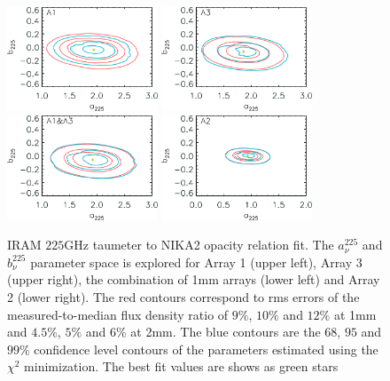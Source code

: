 \begin{figure}[ht!]
  \begin{center}
    \includegraphics[clip=true, trim={0, -0.3cm, -0.3cm, 0}, width=0.4\textwidth]{Figures/Opacity/fit_nika2_tau_from_taumeter_mwc349_a1.pdf}
    \includegraphics[clip=true, trim={0, -0.3cm, -0.3cm, 0}, width=0.4\textwidth]{Figures/Opacity/fit_nika2_tau_from_taumeter_mwc349_a3.pdf}
    \includegraphics[clip=true, trim={0, -0.3cm, -0.3cm, 0}, width=0.4\textwidth]{Figures/Opacity/fit_nika2_tau_from_taumeter_mwc349_1mm.pdf}
    \includegraphics[clip=true, trim={0, -0.3cm, -0.3cm, 0}, width=0.4\textwidth]{Figures/Opacity/fit_nika2_tau_from_taumeter_mwc349_a2.pdf}
    \caption[IRAM taumeter to NIKA2 opacity model]{IRAM $225$GHz taumeter to
    NIKA2 opacity relation fit.
    The $a_{\nu}^{225}$ and
    $b_{\nu}^{225}$ parameter space is explored for Array 1 (upper left),
    Array 3 (upper right), the combination of 1mm arrays (lower left)
    and Array 2 (lower right).
    The red contours correspond to rms
    errors of the measured-to-median flux density ratio of $9\%$, $10\%$
    and $12\%$ at 1mm and $4.5\%$, $5\%$ and $6\%$ at 2mm. The blue
    contours are the $68$, $95$ and $99\%$ confidence
    level contours of the parameters estimated using the $\chi^2$
    minimization.
    The best fit values are shows as green stars} 
\label{fig:taumeter_fit}
\end{center}
\end{figure}

